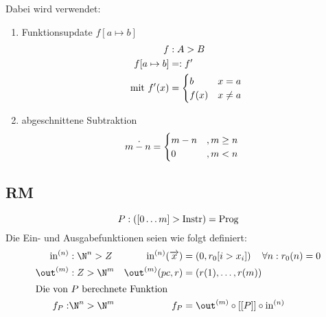 Dabei wird verwendet: 
\begin{enumerate}
	\item 
	Funktionsupdate $f[a \mapsto b]$ 
	\begin{align*}
		f&: A\->B\\
		f[a\mapsto b] &=: f'\\
		\text{mit } f'(x) &=
		\begin{cases}
			b & x=a \\
			f(x) & x\ne a
		\end{cases}
	\end{align*}
	\item abgeschnittene Subtraktion
	\begin{align*}
		m \overset{\text{\normalsize .}}- n &=
		\begin{cases}
			m-n &,m\geq n\\
			0 &, m<n
		\end{cases}
	\end{align*}
\end{enumerate}


\subsection*{\acl{RM}}
\[ P:([0\dots m] \-> \text{Instr}) = \text{Prog} \]
Die Ein- und Ausgabefunktionen seien wie folgt definiert:
\begin{align*}
	\text{in}^{(n)} &:\N^n \-> Z & \text{in}^{(n)}(\overrightarrow{x}) &= \left( 0,r_0[i\->x_i] \right) \quad \forall n: r_0(n)=0\\
	\out^{(m)} &: Z \-> \N^m & \out^{(m)}(pc,r) &= \left( r(1),\dots,r(m) \right)\\
	\shortintertext{Die von $P$ berechnete Funktion}
	f_P: &\N^n \->\N^m & f_P &= \out^{(m)} \circ [[P]]\circ \text{in}^{(n)}
\end{align*}

